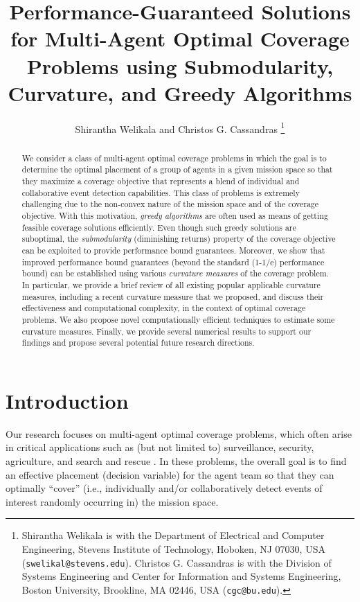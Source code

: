 \documentclass[letterpaper, 10 pt, conference]{ieeeconf}
\title{\LARGE \bf
Performance-Guaranteed Solutions for Multi-Agent Optimal Coverage Problems using Submodularity, Curvature, and Greedy Algorithms 
\vspace{-5mm}
}
\author{Shirantha Welikala and Christos G. Cassandras
\thanks{Shirantha Welikala is with the Department of Electrical and Computer Engineering, Stevens Institute of Technology, Hoboken, NJ 07030, USA (\texttt{{\small swelikal@stevens.edu}}). Christos G. Cassandras is with the Division of Systems Engineering and Center for Information and Systems Engineering, Boston University, Brookline, MA 02446, USA (\texttt{{\small cgc@bu.edu}}).}
}
\begin{document}
\maketitle

\thispagestyle{plain}
\pagestyle{plain}


\vspace{-10mm}
\begin{abstract}
We consider a class of multi-agent optimal coverage problems in which the goal is to determine the optimal placement of a group of agents in a given mission space so that they maximize a coverage objective that represents a blend of individual and collaborative event detection capabilities. This class of problems is extremely challenging due to the non-convex nature of the mission space and of the coverage objective. With this motivation, \emph{greedy algorithms} are often used as means of getting feasible coverage solutions efficiently. Even though such greedy solutions are suboptimal, the \emph{submodularity} (diminishing returns) property of the coverage objective can be exploited to provide performance bound guarantees. Moreover, we show that improved performance bound guarantees (beyond the standard (1-1/e) performance bound) can be established using various \emph{curvature measures} of the coverage problem. In particular, we provide a brief review of all existing popular applicable curvature measures, including a recent curvature measure that we proposed, and discuss their effectiveness and computational complexity, in the context of optimal coverage problems. We also propose novel computationally efficient techniques to estimate some curvature measures. Finally, we provide several numerical results to support our findings and propose several potential future research directions. 
\end{abstract}



\vspace{-2mm}
\section{Introduction}


Our research focuses on multi-agent optimal coverage problems, which often arise in critical applications such as (but not limited to) surveillance, security, agriculture, and search and rescue \cite{Rezazadeh2019,Cohen2008}. In these problems, the overall goal is to find an effective placement (decision variable) for the agent team so that they can optimally ``cover'' (i.e., individually and/or collaboratively detect events of interest randomly occurring in) the mission space. 
\end{document}
